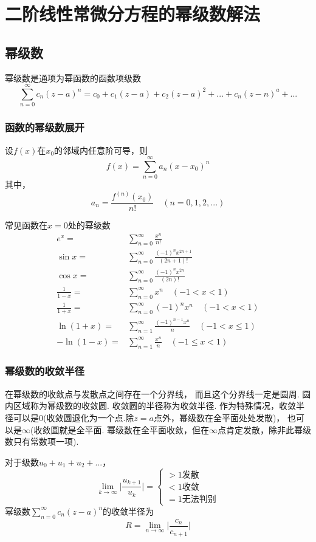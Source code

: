 \newpage
\section{二阶线性常微分方程的幂级数解法}
\subsection{幂级数}
\begin{dfn}[幂级数是通项为幂函数的函数项级数]
幂级数是通项为幂函数的函数项级数
$$\sum_{n=0}^\infty c_n(z-a)^n=c_0+c_1(z-a)+c_2(z-a)^2+...+c_n(z-n)^a+...$$
\end{dfn}
\subsubsection{函数的幂级数展开}
设$f(x)$在$x_0$的邻域内任意阶可导，则
$$f(x)=\sum_{n=0}^\infty a_n(x-x_0)^n$$
其中，
$$a_n=\frac{f^{(n)}(x_0)}{n!}\quad(n=0,1,2,...)$$

常见函数在$x=0$处的幂级数
$$\begin{aligned}
e^x=&\sum_{n=0}^\infty\frac{x^n}{n!}\\
\sin x=&\sum_{n=0}^\infty\frac{(-1)^nx^{2n+1}}{(2n+1)!}\\
\cos x=&\sum_{n=0}^\infty\frac{(-1)^nx^{2n}}{(2n)!}\\
\frac{1}{1-x}=&\sum_{n=0}^\infty x^n\quad(-1<x<1)\\
\frac{1}{1+x}=&\sum_{n=0}^\infty(-1)^nx^n\quad(-1<x<1)\\
\ln(1+x)=&\sum_{n=1}^\infty\frac{(-1)^{n-1}x^n}{n}\quad(-1<x\le1)\\
-\ln(1-x)=&\sum_{n=1}^\infty\frac{x^n}{n}\quad(-1\le x<1)
\end{aligned}$$

\subsubsection{幂级数的收敛半径}
在幂级数的收敛点与发散点之间存在一个分界线，
而且这个分界线一定是圆周. 圆内区域称为幂级数的收敛圆. 收敛圆的半径称为收敛半径. 
作为特殊情况，收敛半径可以是$0$(收敛圆退化为一个点.除$z=a$点外，幂级数在全平面处处发散)，
也可以是$\infty$(收敛圆就是全平面. 幂级数在全平面收敛，但在$\infty$点肯定发散，除非此幂级数只有常数项一项).
\begin{thm}[达朗贝尔判别法]\label{dAlembert}
    对于级数$u_0+u_1+u_2+...$，
    $$\lim_{k\rightarrow\infty}\bigg|\frac{u_{k+1}}{u_k}\bigg|=
    \begin{cases}
    >1 \mbox{发散}\\
    <1 \mbox{收敛}\\
    =1 \mbox{无法判别}
    \end{cases}$$
幂级数$\sum_{n=0}^\infty c_n(z-a)^n$的收敛半径为
$$R=\lim_{n\rightarrow\infty}\bigg|\frac{c_n}{c_{n+1}}\bigg|$$
\end{thm}
    
